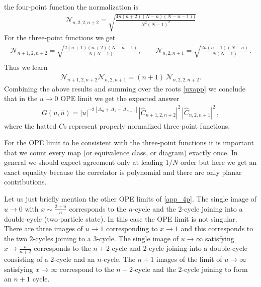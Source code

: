 \documentclass[letterpaper]{JHEP3}
\def\be{\begin{equation}}
\def\ee{\end{equation}}
\def\be{\begin{eqnarray}}
\def\ee{\end{eqnarray}}
\begin{document}
the four-point function the normalization is
\be
{\mathcal N}_{n,2,2,n+2}=\sqrt{\frac{4n(n+2)(N-n)(N-n-1))}{N^2(N-1)^2}}
\ee For the three-point functions we get
\be
{\mathcal N}_{n+1,2,n+2}=\sqrt{\frac{ 2 (n+1) (n+2) (N-n-1) }{ N (N-1) } },\qquad
{\mathcal N}_{n,2,n+1}=\sqrt{\frac{ 2n (n+1) (N-n) }{ N (N-1) } }.\nonumber\\
\ee Thus we learn
\be
{\mathcal N}_{n+1,2,n+2}{\mathcal N}_{n,2,n+1}=(n+1)\,{\mathcal N}_{n,2,2,n+2}.
\ee Combining the above results and summing over the  roots \eqref{uxapp} we conclude that in the $u\to 0$ OPE limit we get the expected answer
\be
G(u,\bar u)=|u|^{-2\left[\Delta_n+\Delta_2-\Delta_{n+1}\right]} |\hat C_{n+1,2,n+2}|^2\, |\hat C_{n,2,n+1}|^2 \, ,
\ee where the hatted $C$s represent properly normalized three-point functions.

For the OPE limit to be consistent with the three-point functions it is important that we count
every map (or equivalence class, or diagram) exactly once.
In general we should expect agreement only at leading $1/N$ order but here we get an exact equality because
the correlator is polynomial and there are only planar contributions.

Let us just briefly mention the other OPE limits of \eqref{app_4p}. The single image of $u\to 0$
with $x\sim\frac{2+n}{n}$ corresponds to the $n$-cycle and the 2-cycle joining into 
a double-cycle (two-particle state). In this case the OPE limit is not singular. 
There are three images of $u\to 1$ corresponding to $x\to 1$ and
this corresponds to the two $2$-cycles joining to a 3-cycle. The single image of $u\to\infty$ satisfying
$x\to\frac{n}{n+2}$ corresponds to the $n+2$-cycle and $2$-cycle joining into a double-cycle consisting of a $2$-cycle and
an $n$-cycle. The $n+1$ images of the limit of $u\to\infty$ satisfying $x\to\infty$ correspond to the $n+2$-cycle
and the $2$-cycle joining to form an $n+1$ cycle.






\end{document}

